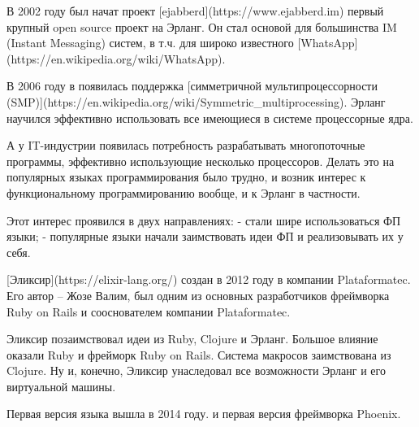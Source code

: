 \documentclass[10pt]{beamer}
\begin{document}
В 2002 году был начат проект [ejabberd](https://www.ejabberd.im)
первый крупный open source проект на Эрланг.
Он стал основой для большинства IM (Instant Messaging) систем,
в т.ч. для широко известного [WhatsApp](https://en.wikipedia.org/wiki/WhatsApp).

В 2006 году в появилась поддержка [симметричной мультипроцессорности (SMP)](https://en.wikipedia.org/wiki/Symmetric_multiprocessing).
Эрланг научился эффективно использовать все имеющиеся в системе процессорные ядра.

А у IT-индустрии появилась потребность разрабатывать многопоточные программы,
эффективно использующие несколько процессоров.
Делать это на популярных языках программирования было трудно,
и возник интерес к функциональному программированию вообще, и к Эрланг в частности.

Этот интерес проявился в двух направлениях:
- стали шире использоваться ФП языки;
- популярные языки начали заимствовать идеи ФП и реализовывать их у себя.

[Эликсир](https://elixir-lang.org/) создан в 2012 году в компании Plataformatec.
Его автор -- Жозе Валим,
был одним из основных разработчиков фреймворка Ruby on Rails
и сооснователем компании Plataformatec.

Эликсир позаимствовал идеи из Ruby, Clojure и Эрланг.
Большое влияние оказали Ruby и фрейморк Ruby on Rails.
Система макросов заимствована из Clojure.
Ну и, конечно, Эликсир унаследовал все возможности Эрланг и его виртуальной машины.

Первая версия языка вышла в 2014 году.
и первая версия фреймворка Phoenix.
\end{document}
